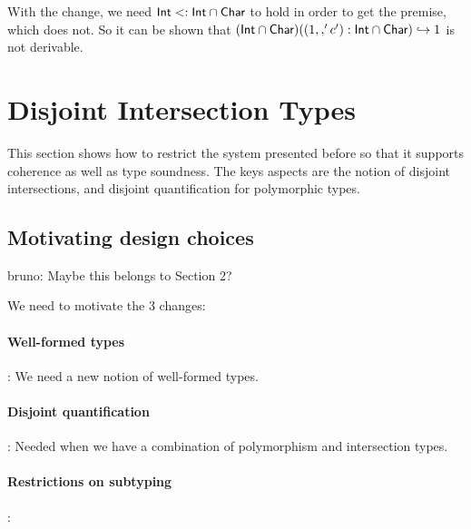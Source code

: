 \documentclass[nocopyrightspace,preprint,times,9pt]{sigplanconf}
\newcommand{\authornote}[3]{{\color{#2} {\sc #1}: #3}}
\newcommand\bruno[1]{\authornote{bruno}{red}{#1}}
\begin{document}
\begin{mathpar}

\end{mathpar}


With the change, we need $\code{Int} \subtype \code{Int} \intersect \code{Char}$ to
hold in order to get the premise, which does not. So it can be shown that
$(\code{Int} \intersect \code{Char}) ((1 \mergeOp 'c') : \code{Int} \intersect
\code{Char}) \hookrightarrow 1$ is not derivable.








\section{Disjoint Intersection Types}

This section shows how to restrict the system presented before
so that it supports coherence as well as type soundness.
The keys aspects are the notion of disjoint intersections,
and disjoint quantification for polymorphic types.

\subsection{Motivating design choices}\bruno{Maybe this belongs to Section 2?}

We need to motivate the 3 changes:

\paragraph{Well-formed types}: We need a new notion of well-formed types.

\paragraph{Disjoint quantification}: Needed when we have a
combination of polymorphism and intersection types.

\paragraph{Restrictions on subtyping}:
\end{document}
